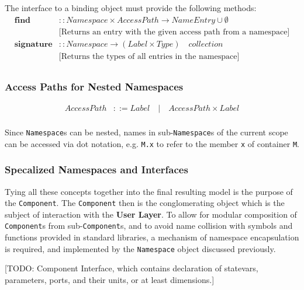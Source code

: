 \documentclass[a4paper]{article}
\newcommand\nmlClass[1]{{\tt #1}}
\begin{document}
The interface to a binding object must provide the following methods:
\begin{equation*}
\begin{array}{ll}
   \mathbf{find}  & :: Namespace \times AccessPath \rightarrow
   NameEntry \cup \emptyset \\
   & \textrm{[Returns an entry with the given access path from a namespace]} \\
   \mathbf{signature}  & :: Namespace \rightarrow (Label \times Type) \quad collection \\
   & \textrm{[Returns the types of all entries in the namespace]} \\
\end{array}
\end{equation*}

\subsubsection{Access Paths for Nested Namespaces}

\begin{equation*}
\begin{array}{ll}
   AccessPath & ::= Label  \quad \lvert \quad AccessPath \times Label \\
\end{array}
\end{equation*}

Since \nmlClass{Namespace}s can be nested, names in
sub-\nmlClass{Namespace}s of the current scope can be accessed via dot
notation, e.g. \verb^M.x^ to refer to the member \verb^x^ of container
\verb^M^.

\subsubsection{Specalized Namespaces and Interfaces}

Tying all these concepts together into the final resulting model is
the purpose of the \nmlClass{Component}.  The \nmlClass{Component} then is the
conglomerating object which is the subject of interaction with the
\textbf{User Layer}.  To allow for modular composition of \nmlClass{Component}s
from sub-\nmlClass{Component}s, and to avoid name collision with symbols and
functions provided in standard libraries, a mechanism of namespace
encapsulation is required, and implemented by the \nmlClass{Namespace} object discussed previously.

[TODO: Component Interface, which contains declaration of statevars, parameters, ports, and their units, or at least dimensions.]
\end{document}
